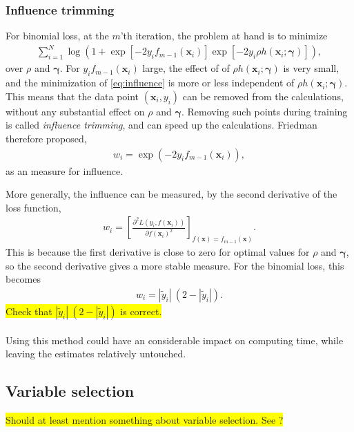 \subsubsection{Influence trimming}
\label{sub:Influence trimming}
For binomial loss, at the $m$'th iteration, the problem at hand is to minimize
\begin{align}
  \label{eq:influence} 
  \sum_{i = 1}^{N} \log \left( 1 + \exp[ -2 y_i f_{m-1}(\mathbf{x}_i)] \exp [-2 y_i \rho h(\mathbf{x}_i; \bm \gamma)] \right),
\end{align}
over $\rho$ and $\bm \gamma$.  For $y_i f_{m-1}(\mathbf{x}_i)$ large, the effect of of $\rho h(\mathbf{x}_i; \bm{\gamma})$ is very small, and the minimization of \eqref{eq:influence} is more or less independent of $\rho h(\mathbf{x}_i; \bm \gamma)$. This means that the data point $(\mathbf{x}_i, y_i)$ can be removed from the calculations, without any substantial effect on $\rho$ and $\bm \gamma$. Removing such points during training is called \textit{influence trimming}, and can speed up the calculations. Friedman therefore proposed,
\begin{align}
  w_i = \exp (- 2 y_i f_{m-1}(\mathbf{x}_i)), 
\end{align}
as an measure for influence. 

More generally, the influence can be measured, by the second derivative of the loss function,
\begin{align}
  w_i = \left[ \frac{\partial^2 L(y_i, f(\mathbf{x}_i)) }{\partial f(\mathbf{x}_i)^2}  \right]_{f(\mathbf{x}) = f_{m-1}(\mathbf{x})}.
\end{align}
This is because the first derivative is close to zero for optimal values for $\rho$ and $\bm \gamma$, so the second derivative gives a more stable measure.  For the binomial loss, this becomes 
\begin{align}
  w_i = |\tilde y_i| \: (2 - |\tilde y_i|). 
\end{align}
\colorbox{yellow}{Check that $|\tilde{y}_i|\: (2 - |\tilde{y}_i|)$ is correct.}\\
\\
Using this method could have an considerable impact on computing time, while leaving the estimates relatively untouched. 




\subsection{Variable selection}
\label{sub:Variable selection}
\colorbox{yellow}{Should at least mention something about variable selection. See \cite[sec. 8.1]{friedman}?}

